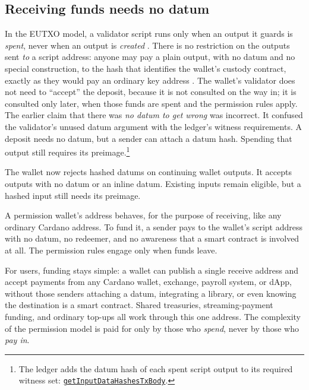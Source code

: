 \documentclass[11pt,DIV=11,parskip=half-]{scrartcl}
\begin{document}
\subsection{Receiving funds needs no datum}
\label{sub:datum-free}
In the EUTXO model, a validator script runs only when an output it guards is \emph{spent}, never when an output is \emph{created} \cite{eutxoPaper, cardanoEUTXO}. There is no restriction on the outputs sent \emph{to} a script address: anyone may pay a plain output, with no datum and no special construction, to the hash that identifies the wallet's custody contract, exactly as they would pay an ordinary key address \cite{cardanoEUTXO}. The wallet's validator does not need to ``accept'' the deposit, because it is not consulted on the way in; it is consulted only later, when those funds are spent and the permission rules apply.
The earlier claim that there was \emph{no datum to get wrong} was incorrect. It confused the validator's unused datum argument with the ledger's witness requirements. A deposit needs no datum, but a sender can attach a datum hash. Spending that output still requires its preimage.\footnote{The ledger adds the datum hash of each spent script output to its required witness set: \href{https://github.com/IntersectMBO/cardano-ledger/blob/master/eras/alonzo/impl/src/Cardano/Ledger/Alonzo/UTxO.hs\#L248-L261}{\texttt{getInputDataHashesTxBody}}.}

The wallet now rejects hashed datums on continuing wallet outputs. It accepts outputs with no datum or an inline datum. Existing inputs remain eligible, but a hashed input still needs its preimage.
\begin{guaranteebox}
A permission wallet's address behaves, for the purpose of receiving, like any
ordinary Cardano address. To fund it, a sender pays to the wallet's script
address with no datum, no redeemer, and no awareness that a smart contract is
involved at all. The permission rules engage only when funds leave.
\end{guaranteebox}

\noindent For users, funding stays simple: a wallet can publish a single receive address and accept payments from any Cardano wallet, exchange, payroll system, or dApp, without those senders attaching a datum, integrating a library, or even knowing the destination is a smart contract. Shared treasuries, streaming-payment funding, and ordinary top-ups all work through this one address. The complexity of the permission model is paid for only by those who \emph{spend}, never by those who \emph{pay in}.
\end{document}
